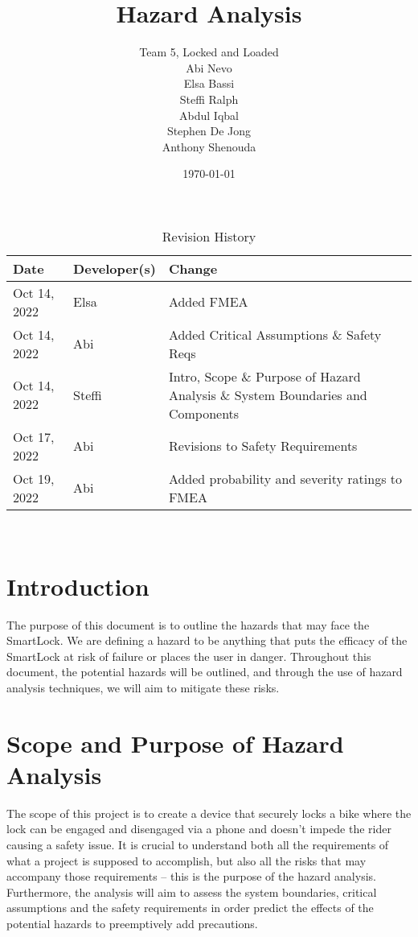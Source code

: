 \documentclass{article}
\title{Hazard Analysis\\\progname}
\author{Team 5, Locked and Loaded
		\\ Abi Nevo\\Elsa Bassi\\Steffi Ralph\\Abdul Iqbal\\Stephen De Jong\\Anthony Shenouda
}
\date{\today}
\begin{document}

\maketitle

\newpage

\begin{table}[hp]
\caption{Revision History} \label{TblRevisionHistory}
\begin{tabularx}{\textwidth}{llX}
\toprule
\textbf{Date} & \textbf{Developer(s)} & \textbf{Change}\\
\midrule
Oct 14, 2022 & Elsa & Added FMEA\\
Oct 14, 2022 & Abi & Added Critical Assumptions \& Safety Reqs\\
Oct 14, 2022 & Steffi & Intro, Scope \& Purpose of Hazard Analysis \& System Boundaries and Components\\
Oct 17, 2022 & Abi & Revisions to Safety Requirements\\
Oct 19, 2022 & Abi & Added probability and severity ratings to FMEA \\
\bottomrule
\end{tabularx}
\end{table}

\newpage


\tableofcontents

~\newpage

\section{Introduction}
The purpose of this document is to outline the hazards that may face the SmartLock.  We are defining a hazard to be anything that puts the efficacy of the SmartLock at risk of failure or places the user in danger. 
Throughout this document, the potential hazards will be outlined, and through the use of hazard analysis techniques, we will aim to mitigate these risks. 

\section{Scope and Purpose of Hazard Analysis}

The scope of this project is to create a device that securely locks a bike where the lock can be engaged and disengaged via a phone and doesn’t impede the rider causing a safety issue.  It is crucial to understand both all the requirements of what a project is supposed to accomplish, but also all the risks that may accompany those requirements – this is the purpose of the hazard analysis.  Furthermore, the analysis will aim to assess the system boundaries, critical assumptions and the safety requirements in order predict the effects of the potential hazards to preemptively add precautions. 
\end{document}
